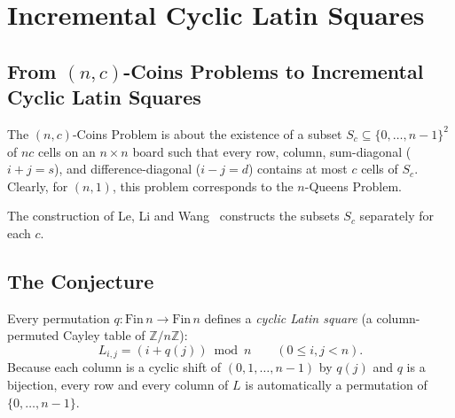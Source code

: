 \documentclass[11pt,a4paper]{article}
\theoremstyle{remark}
\begin{document}
\begin{abstract}
\vspace{12pt}

\noindent For all four families an Incremental Cyclic Latin Square can be constructed. Constructing
an Incremental Cyclic Latin Square for the four uncovered natural numbers, $n \in \{8, 9, 15, 21\}$,
is handled separately. Likewise, constructing an Incremental (non-Cyclic) Latin Square for the two
remaining natural numbers, $n \in \{4, 6\}$, is also handled separately.

\end{abstract}

\section{Incremental Cyclic Latin Squares}

\subsection{From \texorpdfstring{$(n,c)$}{(n,c)}-Coins Problems to Incremental Cyclic Latin Squares}

The $(n,c)$-Coins Problem is about the existence of a subset $S_c \subseteq \{0, \dots, n-1\}^2$ of
$nc$ cells on an $n \times n$ board such that every row, column, sum-diagonal ($i + j = s$), and
difference-diagonal ($i - j = d$) contains at most $c$ cells of $S_c$. Clearly, for $(n,1)$, this
problem corresponds to the $n$-Queens Problem.

\vspace{12pt}

The construction of Le, Li and Wang~\cite{LLW1990} constructs the subsets $S_c$ separately for each 
$c$.

\vspace{12 pt}

\subsection{The Conjecture}

Every permutation $q : \mathrm{Fin}\,n \to \mathrm{Fin}\,n$ defines a \emph{cyclic Latin square} (a column-permuted Cayley table of $\mathbb{Z}/n\mathbb{Z}$):
\[
  L_{i,j} = (i + q(j)) \bmod n \qquad (0 \le i, j < n).
\]
Because each column is a cyclic shift of $(0, 1, \dots, n-1)$ by $q(j)$ and $q$ is a bijection, every row and every column of $L$ is automatically a permutation of $\{0, \dots, n-1\}$.

\vspace{12 pt}
\end{document}
